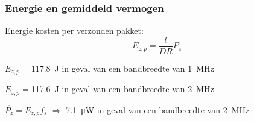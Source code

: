 \begin{frame}
    \frametitle{Energie en gemiddeld vermogen}

    Energie kosten per verzonden pakket:
    \begin{equation*}
        E_{z,p}=\frac{l}{DR}P_z
    \end{equation*}

    \pause

    $E_{z,p}=$\qty{117.8}{\joule} in geval van een bandbreedte van \qty{1}{\mega\hertz}

    $E_{z,p}=$\qty{117.6}{\joule} in geval van een bandbreedte van \qty{2}{\mega\hertz}

    \pause

    \vspace{1cm}
    $\overline{P_z}=E_{z,p}f_s$ $\Rightarrow$ \qty{7.1}{\micro\watt} in geval van een bandbreedte van \qty{2}{\mega\hertz}

\end{frame}